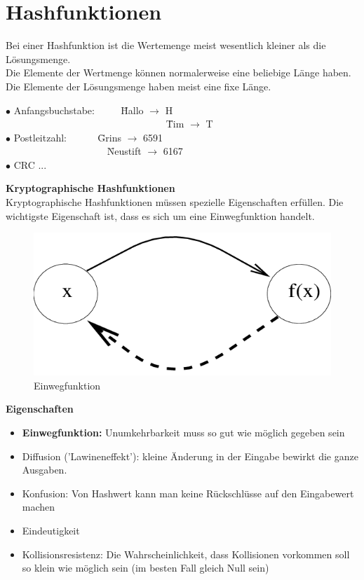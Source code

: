 \chapter{Hashfunktionen}
Bei einer Hashfunktion ist die Wertemenge meist wesentlich kleiner als die Lösungsmenge. \\
Die Elemente der Wertmenge können normalerweise eine beliebige Länge haben. \\
Die Elemente der Lösungsmenge haben meist eine fixe Länge.

\begin{tabbing}
	$\bullet$ Anfangsbuchstabe: ~~~~ \= Hallo $\rightarrow$ H \\
	~~~~~~~~~~~~~~~~~~~~~~~~~~~~~~~~ \= Tim $\rightarrow$ T \\
	$\bullet$ Postleitzahl: ~~~~~ \= Grins $\rightarrow$ 6591 \\
	~~~~~~~~~~~~~~~~~~~~ \= Neustift $\rightarrow$ 6167 \\
	$\bullet$ CRC ...
\end{tabbing}

\textbf{Kryptographische Hashfunktionen} \\
Kryptographische Hashfunktionen müssen spezielle Eigenschaften erfüllen. Die wichtigste Eigenschaft ist, dass es sich um eine Einwegfunktion handelt.
\begin{figure}[H]
	\centering
	\includegraphics[width=0.6\linewidth]{figures/oneway.png}
	\caption{Einwegfunktion}
\end{figure}

\textbf{Eigenschaften}
\begin{itemize}
	\item \textbf{Einwegfunktion:} Unumkehrbarkeit muss so gut wie möglich gegeben sein
	\item Diffusion ('Lawineneffekt'): kleine Änderung in der Eingabe bewirkt die ganze Ausgaben.
	\item Konfusion: Von Hashwert kann man keine Rückschlüsse auf den Eingabewert machen
	\item Eindeutigkeit
	\item Kollisionsresistenz: Die Wahrscheinlichkeit, dass Kollisionen vorkommen soll so klein wie möglich sein (im besten Fall gleich Null sein)
\end{itemize}

